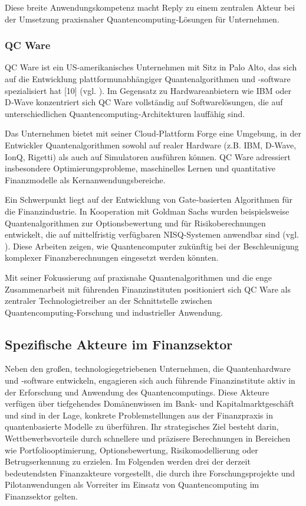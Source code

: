 Diese breite Anwendungskompetenz macht Reply zu einem zentralen Akteur bei der Umsetzung praxisnaher Quantencomputing‑Lösungen für Unternehmen.

\subsubsection*{QC Ware}
QC Ware ist ein US‑amerikanisches Unternehmen mit Sitz in Palo Alto, das sich auf die Entwicklung plattformunabhängiger Quantenalgorithmen und -software spezialisiert hat [10] (vgl. \cite{brandhofer_benchmarking_2022}).
Im Gegensatz zu Hardwareanbietern wie IBM oder D‑Wave konzentriert sich QC Ware vollständig auf Softwarelösungen, die auf unterschiedlichen Quantencomputing‑Architekturen lauffähig sind.

Das Unternehmen bietet mit seiner Cloud‑Plattform Forge eine Umgebung, in der Entwickler Quantenalgorithmen sowohl auf realer Hardware (z.B. IBM, D‑Wave, IonQ, Rigetti) als auch auf Simulatoren ausführen können. QC Ware adressiert insbesondere Optimierungsprobleme, maschinelles Lernen und quantitative Finanzmodelle als Kernanwendungsbereiche.

Ein Schwerpunkt liegt auf der Entwicklung von Gate‑basierten Algorithmen für die Finanzindustrie. In Kooperation mit Goldman Sachs wurden beispielsweise Quantenalgorithmen zur Optionsbewertung und für Risikoberechnungen entwickelt, die auf mittelfristig verfügbaren NISQ‑Systemen anwendbar sind (vgl. \cite{stamatopoulos_option_2020}). Diese Arbeiten zeigen, wie Quantencomputer zukünftig bei der Beschleunigung komplexer Finanzberechnungen eingesetzt werden könnten.

Mit seiner Fokussierung auf praxisnahe Quantenalgorithmen und die enge Zusammenarbeit mit führenden Finanzinstituten positioniert sich QC Ware als zentraler Technologietreiber an der Schnittstelle zwischen Quantencomputing‑Forschung und industrieller Anwendung.

\subsection{Spezifische Akteure im Finanzsektor}
Neben den großen, technologiegetriebenen Unternehmen, die Quantenhardware und ‑software entwickeln, engagieren sich auch führende Finanzinstitute aktiv in der Erforschung und Anwendung des Quantencomputings.  
Diese Akteure verfügen über tiefgehendes Domänenwissen im Bank‑ und Kapitalmarktgeschäft und sind in der Lage, konkrete Problemstellungen aus der Finanzpraxis in quantenbasierte Modelle zu überführen.  
Ihr strategisches Ziel besteht darin, Wettbewerbsvorteile durch schnellere und präzisere Berechnungen in Bereichen wie Portfoliooptimierung, Optionsbewertung, Risikomodellierung oder Betrugserkennung zu erzielen.  
Im Folgenden werden drei der derzeit bedeutendsten Finanzakteure vorgestellt, die durch ihre Forschungsprojekte und Pilotanwendungen als Vorreiter im Einsatz von Quantencomputing im Finanzsektor gelten.

